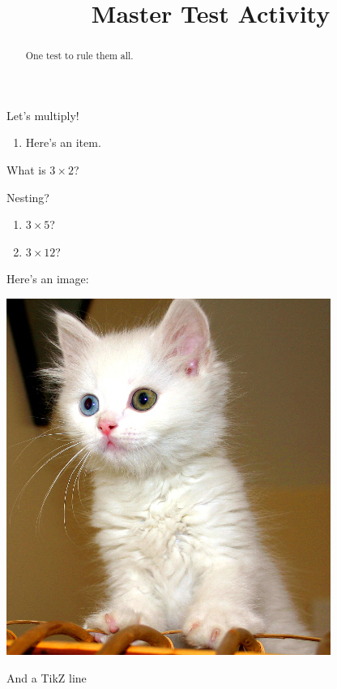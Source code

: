 \documentclass{ximera}
\title{Master Test Activity}
\begin{document}
\begin{abstract}
  One test to rule them all.
\end{abstract}

Let's multiply!

\begin{enumerate}[align=left]
	\item Here's an item.
\end{enumerate}

\begin{question}
	What is $3 \times 2$?  
	\begin{question}
		Nesting? 
	\end{question}
	\begin{enumerate}
		\item \begin{prompt} $3 \times 5$?  \end{prompt}
		\item $3 \times 12$? 
	\end{enumerate}
\end{question}

Here's an image:
\begin{image}
	\includegraphics{testCat.jpg}
\end{image}
And a TikZ line
\begin{image}
\end{image}
\end{document}
